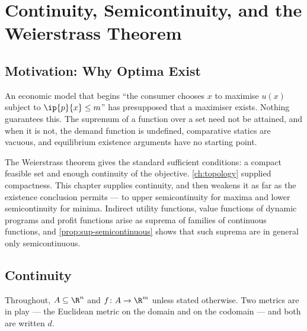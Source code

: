 
\chapter{Continuity, Semicontinuity, and the Weierstrass Theorem}
\label{ch:continuity}

\section{Motivation: Why Optima Exist}\label{sec:cont-motivation}

An economic model that begins ``the consumer chooses $x$ to maximise $u(x)$
subject to $\ip{p}{x}\leq m$'' has presupposed that a maximiser exists. Nothing
guarantees this. The supremum of a function over a set need not be attained, and
when it is not, the demand function is undefined, comparative statics are
vacuous, and equilibrium existence arguments have no starting point.

The Weierstrass theorem gives the standard sufficient conditions: a compact
feasible set and enough continuity of the objective. \autoref{ch:topology}
supplied compactness. This chapter supplies continuity, and then weakens it as
far as the existence conclusion permits --- to upper semicontinuity for maxima
and lower semicontinuity for minima. Indirect utility functions, value functions of dynamic programs and profit functions
arise as suprema of families of continuous functions, and
\autoref{prop:sup-semicontinuous} shows that such suprema are in general only
semicontinuous.

\section{Continuity}\label{sec:cont-basic}

Throughout, $A\subseteq\R^n$ and $f\colon A\to\R^m$ unless stated otherwise. Two
metrics are in play --- the Euclidean metric on the domain and on the codomain
--- and both are written $d$.

